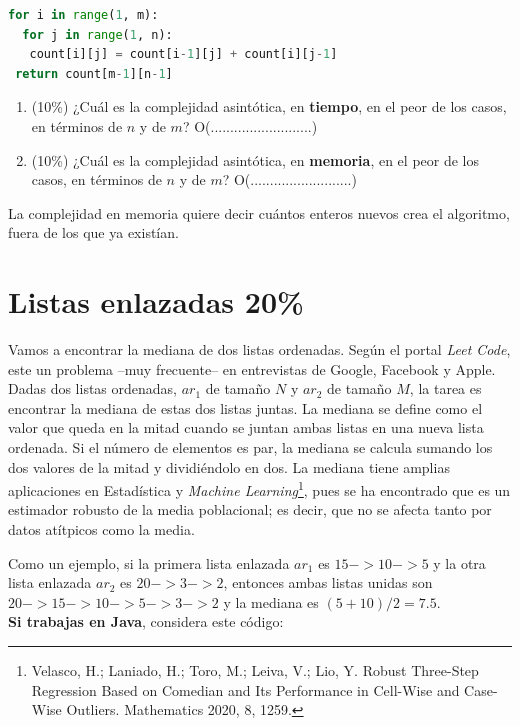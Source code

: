\documentclass[10 pt]{article}
\begin{document}
\begin{multicols}{2}
{\begin{lstlisting}[language=Python]
 for i in range(1, m): 
  for j in range(1, n):              
   count[i][j] = count[i-1][j] + count[i][j-1] 
 return count[m-1][n-1]
\end{lstlisting}
}
 

\begin{enumerate}[label=\Alph*]
	\item (10\%) ¿Cuál es la complejidad asintótica, en \textbf{tiempo}, en el peor de los casos, en términos de $n$ y de $m$? O(..........................)
	\item (10\%) ¿Cuál es la complejidad asintótica, en \textbf{memoria}, en el peor de los casos, en términos de $n$ y de $m$? O(..........................)
\end{enumerate}

La complejidad en memoria quiere decir cuántos enteros nuevos crea el algoritmo, fuera de los que ya existían.


\section{Listas enlazadas 20\%}
Vamos a encontrar la mediana de dos listas ordenadas. Según el portal \textit{Leet Code}, este un problema --muy frecuente-- en entrevistas de Google, Facebook y Apple. Dadas dos listas ordenadas, $ar_1$ de tamaño $N$ y $ar_2$ de tamaño $M$, la tarea es encontrar la mediana de estas dos listas juntas. La mediana se define como el valor que queda en la mitad cuando se juntan ambas listas en una nueva lista ordenada. Si el número de elementos es par, la mediana se calcula sumando los dos valores de la mitad y dividiéndolo en dos. La mediana tiene amplias aplicaciones en Estadística y \emph{Machine Learning}\footnote{Velasco, H.; Laniado, H.; Toro, M.; Leiva, V.; Lio, Y. Robust Three-Step Regression Based on Comedian and Its Performance in Cell-Wise and Case-Wise Outliers. Mathematics 2020, 8, 1259. }, pues se ha encontrado que es un estimador robusto de la media poblacional; es decir, que no se afecta tanto por datos atítpicos como la media. 

Como un ejemplo, si la primera lista enlazada $ar_1$ es $15->10->5$ y la otra lista enlazada $ar_2$ es $20->3->2$, entonces ambas listas unidas son $20->15->10->5->3->2$ y la mediana es $(5+10)/2 = 7.5$.\\

\textbf{Si trabajas en Java}, considera este código:


\end{multicols}
\end{document}
